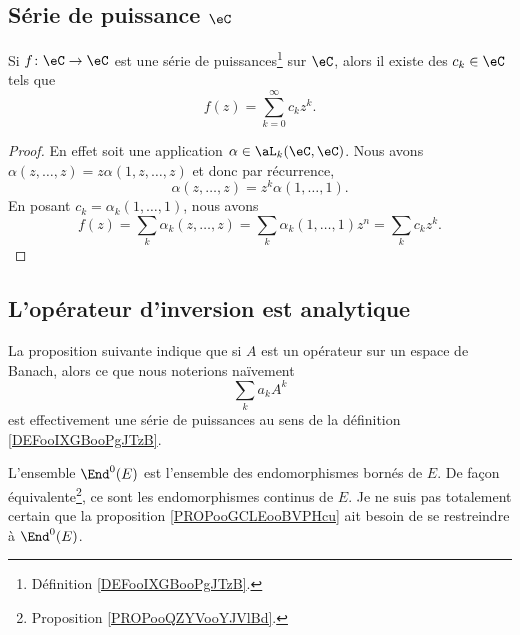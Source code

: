\subsection{Série de puissance \( \eC\)}

\begin{proposition}	\label{PROPooBFGJooYVvYaw}
	Si \(f \colon \eC\to \eC  \) est une série de puissances\footnote{Définition \ref{DEFooIXGBooPgJTzB}.} sur \( \eC\), alors il existe des \( c_k\in \eC\) tels que
	\begin{equation}
		f(z)=\sum_{k=0}^{\infty}c_kz^k.
	\end{equation}
\end{proposition}

\begin{proof}
	En effet soit une application \( \alpha\in \aL_k(\eC,\eC)\). Nous avons \( \alpha(z,\ldots,z)=z\alpha(1,z,\ldots,z)\) et donc par récurrence,
	\begin{equation}
		\alpha(z,\ldots,z)=z^{k}\alpha(1,\ldots,1).
	\end{equation}
	En posant \( c_k=\alpha_k(1,\ldots,1)\), nous avons
	\begin{equation}
		f(z)=\sum_k\alpha_k(z,\ldots,z)=\sum_k\alpha_k(1,\ldots,1)z^n=\sum_kc_kz^k.
	\end{equation}
\end{proof}

\subsection{L'opérateur d'inversion est analytique}

La proposition suivante indique que si \( A\) est un opérateur sur un espace de Banach, alors ce que nous noterions naïvement
\begin{equation}
	\sum_ka_kA^k
\end{equation}
est effectivement une série de puissances au sens de la définition \ref{DEFooIXGBooPgJTzB}.

L'ensemble \( \End^0(E)\) est l'ensemble des endomorphismes bornés de \( E\). De façon équivalente\footnote{Proposition \ref{PROPooQZYVooYJVlBd}.}, ce sont les endomorphismes continus de \( E\). Je ne suis pas totalement certain que la proposition \ref{PROPooGCLEooBVPHcu} ait besoin de se restreindre à \( \End^0(E)\).

